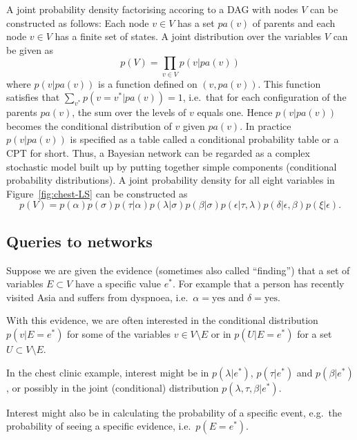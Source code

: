 \documentclass[10pt]{article}\usepackage[]{graphicx}\usepackage[]{color}
\begin{document}
A joint probability density factorising accoring to a DAG with nodes
$V$ can be constructed as follows: Each node $v\in V$ has a set $pa(v)$ of parents and each node
$v\in V$ has a finite set of states. A joint distribution
over the variables $V$ can be given as
\begin{equation}
  \label{eq:dagfact1}
  p(V) = \prod_{v\in V} p(v|pa(v))
\end{equation}
where $p(v|pa(v))$ is a function defined on $(v,pa(v))$. This function
satisfies that $\sum_{v^*} p(v=v^*|pa(v))=1$, i.e.\ that
for each configuration of the parents $pa(v)$, the sum
over the levels of $v$ equals one. Hence $p(v|pa(v))$ becomes the
conditional distribution of $v$ given $pa(v)$.
In practice $p(v|pa(v))$ is specified as a table called a conditional
probability table or a CPT for short.
Thus, a Bayesian network can be regarded as a complex stochastic model built up by
putting together simple components (conditional probability
distributions).
A joint probability density for all eight variables in
Figure~\ref{fig:chest-LS}
can be constructed as 
\begin{equation}
  \label{eq:chestfact1}
  p(V) =
  p(\alpha)p(\sigma)p(\tau|\alpha)p(\lambda|\sigma)p(\beta|\sigma)p(\epsilon|\tau,\lambda)
  p(\delta|\epsilon, \beta)p(\xi|\epsilon).
\end{equation}



\subsection{Queries to networks}
\label{sec:xxx}

Suppose we are given the evidence (sometimes also called ``finding'')
that a set of variables $E\subset V$ have a specific value $e^*$. For
example that a person has recently visited Asia and suffers from
dyspnoea, i.e.\ $\alpha=\mbox{yes}$ and $\delta=\mbox{yes}$.

With this evidence, we are often interested in the
conditional distribution $p(v|E=e^*)$ for some of the variables $v \in
V \setminus E$ or in $p(U|E=e^*)$ for a set $U\subset V
\setminus E$.

In the chest clinic example, interest might be in $p(\lambda|e^*)$, $p(\tau|e^*)$
and  $p(\beta|e^*)$, or possibly in the joint (conditional) distribution
$p(\lambda,\tau,\beta|e^*)$.

Interest might also be in
calculating the probability of a specific event, e.g.\ the probability
of seeing a specific evidence, i.e.\ $p(E=e^*)$.
\end{document}
